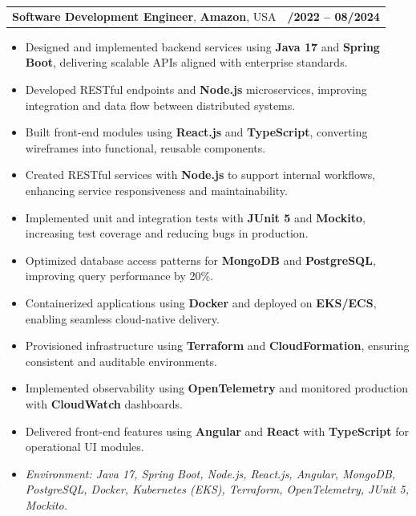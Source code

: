 \documentclass[letterpaper,11pt]{article}
\makeatletter
\newcommand{\resumeItem}[1]{
  \item\footnotesize{
    {#1 \vspace{-2pt}}
  }
}
\newcommand{\resumeSubheading}[4]{
  \vspace{-2pt}\item
    \begin{tabular*}{1.0\textwidth}[t]{l@{\extracolsep{\fill}}r}
      \textbf{\fontsize{10pt}{14pt}\selectfont #3}, \textbf{\fontsize{10pt}{14pt}\selectfont #1}, \fontsize{10pt}{14pt}\selectfont #4 & \textbf{\fontsize{10pt}{14pt}\selectfont #2} \\
    \end{tabular*}\vspace{-7pt}
}
\newcommand{\resumeItemListStart}{\begin{itemize}[leftmargin=*]}
\newcommand{\resumeItemListEnd}{\end{itemize}\vspace{-5pt}}
\makeatother
\begin{document}
\resumeSubheading
{Amazon}{10/2022 -- 08/2024}
{Software Development Engineer}{USA}
\resumeItemListStart
  \resumeItem{Designed and implemented backend services using \textbf{Java 17} and \textbf{Spring Boot}, delivering scalable APIs aligned with enterprise standards.}
  \resumeItem{Developed RESTful endpoints and \textbf{Node.js} microservices, improving integration and data flow between distributed systems.}
  \resumeItem{Built front-end modules using \textbf{React.js} and \textbf{TypeScript}, converting wireframes into functional, reusable components.}
  \resumeItem{Created RESTful services with \textbf{Node.js} to support internal workflows, enhancing service responsiveness and maintainability.}
  \resumeItem{Implemented unit and integration tests with \textbf{JUnit 5} and \textbf{Mockito}, increasing test coverage and reducing bugs in production.}
  \resumeItem{Optimized database access patterns for \textbf{MongoDB} and \textbf{PostgreSQL}, improving query performance by 20\%.}
  \resumeItem{Containerized applications using \textbf{Docker} and deployed on \textbf{EKS/ECS}, enabling seamless cloud-native delivery.}
  \resumeItem{Provisioned infrastructure using \textbf{Terraform} and \textbf{CloudFormation}, ensuring consistent and auditable environments.}
  \resumeItem{Implemented observability using \textbf{OpenTelemetry} and monitored production with \textbf{CloudWatch} dashboards.}
  \resumeItem{Delivered front-end features using \textbf{Angular} and \textbf{React} with \textbf{TypeScript} for operational UI modules.}
  \resumeItem{\textit{Environment: Java 17, Spring Boot, Node.js, React.js, Angular, MongoDB, PostgreSQL, Docker, Kubernetes (EKS), Terraform, OpenTelemetry, JUnit 5, Mockito.}}
\resumeItemListEnd
\end{document}
